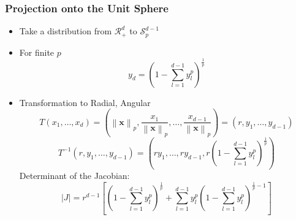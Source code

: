 \documentclass[aspectratio=169]{beamer}
\newcommand{\norm}[1]{\left\lVert #1 \right\rVert}
\newcommand{\pnorm}[2]{\norm{#1}_{#2}}
\begin{document}
\begin{frame}
  \frametitle{Projection onto the Unit Sphere}
  \begin{itemize}
    \item Take a distribution from $\mathcal{R}_+^{d}$ to $\mathcal{S}_{p}^{d-1}$
    \pause
    \item For finite $p$
      \begin{equation*}
        y_d = \left(1 - {\textstyle\sum}_{l = 1}^{d-1}y_l^p\right)^{\frac{1}{p}}
      \end{equation*}
    \pause
    \item Transformation to Radial, Angular
    \begin{equation*}
      T(x_1,\ldots,x_d) = \left(\pnorm{\bm{x}}{p}, \frac{x_1}{\pnorm{\bm{x}}{p}},
                    \ldots , \frac{x_{d-1}}{\pnorm{\bm{x}}{p}}\right) = (r,y_1,\ldots,y_{d-1})
    \end{equation*}
    \pause
    \begin{equation*}
    T^{-1}\left(r,y_1,\ldots,y_{d-1}\right) =
      \left(ry_1,\ldots,ry_{d-1}, r\left(1 - {\textstyle\sum}_{l = 1}^{d-1}y_l^p\right)^{\frac{1}{p}}\right)
    \end{equation*}
    \pause
    Determinant of the Jacobian:
    \begin{equation*}
        \lvert J \rvert = r^{d-1}\left[\left(1 - {\textstyle\sum}_{l = 1}^{d-1}y_l^p\right)^{\frac{1}{p}} +
      {\textstyle\sum}_{l = 1}^{d-1}y_l^p\left(1 - {\textstyle\sum}_{l=1}^{d-1}
          y_l^p\right)^{\frac{1}{p} - 1}\right]
    \end{equation*}
  \end{itemize}
\end{frame} %
\end{document}
